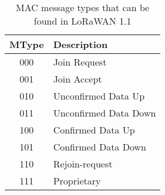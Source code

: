 \begin{table}[H]
\caption{MAC message types that can be found in LoRaWAN 1.1}
\label{tab:message_types}
\centering
\begin{tabular}{|c|l|}
\hline
\textbf{MType} & \textbf{Description}      \\ \hline
000            & Join Request              \\ \hline
001            & Join Accept               \\ \hline
010            & Unconfirmed Data Up       \\ \hline
011            & Unconfirmed Data Down     \\ \hline
100            & Confirmed Data Up         \\ \hline
101            & Confirmed Data Down       \\ \hline
110            & Rejoin-request            \\ \hline
111            & Proprietary               \\ \hline
\end{tabular}
\end{table}
